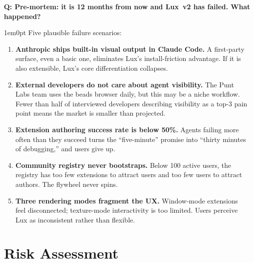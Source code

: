 \documentclass[11pt,letterpaper]{article}
\newcounter{faqnum}
\newenvironment{faqpair}[1]{%
  \needspace{4\baselineskip}%
  \vspace{0.5em}%
  \refstepcounter{faqnum}%
  \noindent\textbf{\color{SectionBlue}Q\thefaqnum: #1}\par\nopagebreak[4]%
  \vspace{0.2em}%
  \begin{adjustwidth}{1em}{0pt}%
  \setlength{\parindent}{0pt}%
}{%
  \end{adjustwidth}%
  \vspace{0.5em}%
}
\begin{document}
\begin{faqpair}{Pre-mortem: it is 12 months from now and Lux~v2 has
  failed.  What happened?}\label{faq:premortem}
  Five plausible failure scenarios:

  \begin{enumerate}[nosep]
    \item \textbf{Anthropic ships built-in visual output in Claude Code.}
      A first-party surface, even a basic one, eliminates Lux's
      install-friction advantage.  If it is also extensible, Lux's
      core differentiation collapses.
    \item \textbf{External developers do not care about agent visibility.}
      The Punt Labs team uses the beads browser daily, but this may be a
      niche workflow.  Fewer than half of interviewed developers describing
      visibility as a top-3 pain point means the market is smaller than
      projected.
    \item \textbf{Extension authoring success rate is below 50\%.}
      Agents failing more often than they succeed turns the ``five-minute''
      promise into ``thirty minutes of debugging,'' and users give up.
    \item \textbf{Community registry never bootstraps.}  Below 100 active
      users, the registry has too few extensions to attract users and too
      few users to attract authors.  The flywheel never spins.
    \item \textbf{Three rendering modes fragment the UX.}  Window-mode
      extensions feel disconnected; texture-mode interactivity is too
      limited.  Users perceive Lux as inconsistent rather than flexible.
  \end{enumerate}
\end{faqpair}


\newpage
\section*{Risk Assessment}
\end{document}
